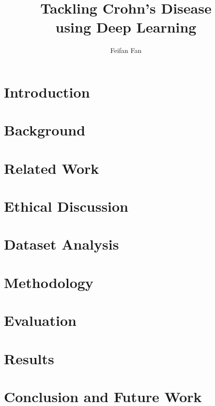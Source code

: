 \documentclass[a4paper,11pt]{report}
\begin{document}
\title{Tackling Crohn's Disease \\ using Deep Learning}
\author{Feifan Fan}





\tableofcontents
\listoffigures

\chapter{Introduction}


\chapter{Background}
\label{cha:background}


\chapter{Related Work}


\chapter{Ethical Discussion}


\chapter{Dataset Analysis}


\chapter{Methodology}
\label{cha:Methodology}


\chapter{Evaluation}
\label{cha:evaluation}


\chapter{Results}


\chapter{Conclusion and Future Work}
\label{cha:Conclusion}



\end{document}
